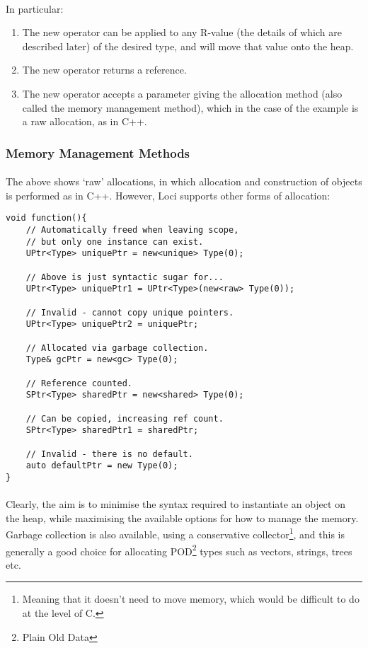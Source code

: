 \documentclass[12pt,twoside,notitlepage]{report}
\begin{document}
\paragraph{}
In particular:

\begin{enumerate}
\item The new operator can be applied to any R-value (the details of which are described later) of the desired type, and will move that value onto the heap.
\item The new operator returns a reference.
\item The new operator accepts a parameter giving the allocation method (also called the memory management method), which in the case of the example is a raw allocation, as in C++.
\end{enumerate}

\clearpage

\subsubsection{Memory Management Methods}

\paragraph{}
The above shows `raw' allocations, in which allocation and construction of objects is performed as in C++. However, Loci supports other forms of allocation:


\begin{lstlisting}
void function(){
	// Automatically freed when leaving scope,
	// but only one instance can exist.
	UPtr<Type> uniquePtr = new<unique> Type(0);
	
	// Above is just syntactic sugar for...
	UPtr<Type> uniquePtr1 = UPtr<Type>(new<raw> Type(0));
	
	// Invalid - cannot copy unique pointers.
	UPtr<Type> uniquePtr2 = uniquePtr;
	
	// Allocated via garbage collection.
	Type& gcPtr = new<gc> Type(0);
	
	// Reference counted.
	SPtr<Type> sharedPtr = new<shared> Type(0);
	
	// Can be copied, increasing ref count.
	SPtr<Type> sharedPtr1 = sharedPtr;
	
	// Invalid - there is no default.
	auto defaultPtr = new Type(0);
}
\end{lstlisting}


\paragraph{}
Clearly, the aim is to minimise the syntax required to instantiate an object on the heap, while maximising the available options for how to manage the memory. Garbage collection is also available, using a conservative collector\footnote{Meaning that it doesn't need to move memory, which would be difficult to do at the level of C.}, and this is generally a good choice for allocating POD\footnote{Plain Old Data} types such as vectors, strings, trees etc.
\end{document}
